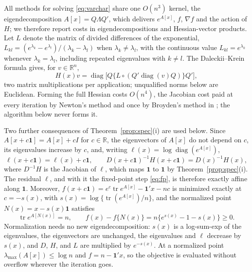 \documentclass[11pt]{article}
\newcommand{\R}{\mathbb{R}}
\newcommand{\tr}{\operatorname{tr}}
\newcommand{\diag}{\operatorname{diag}}
\newcommand{\one}{\mathbf{1}}
\begin{document}
All methods for solving \eqref{eq:varchar} share one $O(n^{3})$
kernel, the eigendecomposition
$A[x]=Q\Lambda Q'$, which delivers $e^{A[x]}$, $f$, $\nabla f$ and the
action of $H$; we therefore report costs in eigendecompositions and
Hessian-vector products. Let $L$ denote the matrix of divided
differences of the exponential,
$L_{kl}=(e^{\lambda_k}-e^{\lambda_l})/(\lambda_k-\lambda_l)$ when
$\lambda_k\neq\lambda_l$, with the continuous value
$L_{kl}=e^{\lambda_k}$ whenever $\lambda_k=\lambda_l$, including
repeated eigenvalues with $k\neq l$. The Daleckii--Krein formula gives,
for $v\in\R^{n}$,
\begin{equation}\label{eq:hv}
H(x)v=\diag\big[Q\{L\circ(Q'\diag(v)Q)\}Q'\big],
\end{equation}
two matrix multiplications per application; unqualified norms below are
Euclidean. Forming the full Hessian costs $O(n^{4})$, the Jacobian cost
paid at every iteration by Newton's method and once by Broyden's method
in \citet{ChenFeiYu:2025}; the algorithm below never forms it.

Two further consequences of Theorem~\ref{prop:spec}(i) are used
below. Since $A[x+c\one]=A[x]+cI$ for $c\in\R$, the eigenvectors of
$A[x]$ do not depend on $c$, its eigenvalues increase by $c$, and,
writing $\ell(x)=\log\diag(e^{A[x]})$,
\begin{equation}\label{eq:shift}
\ell(x+c\one)=\ell(x)+c\one,\qquad
D(x+c\one)^{-1}H(x+c\one)=D(x)^{-1}H(x),
\end{equation}
where $D^{-1}H$ is the Jacobian of $\ell$, which maps $\one$ to
$\one$ by Theorem~\ref{prop:spec}(i). The residual $\ell$, and with
it the fixed-point step \eqref{eq:fp}, is therefore exactly affine
along $\one$. Moreover, $f(x+c\one)=e^{c}\tr e^{A[x]}-\one'x-nc$ is
minimized exactly at $c=-s(x)$, with $s(x)=\log\{\tr(e^{A[x]})/n\}$,
and the normalized point $N(x)=x-s(x)\one$ satisfies
\begin{equation}\label{eq:norm}
\tr e^{A[N(x)]}=n,\qquad
f(x)-f\{N(x)\}=n\{e^{s(x)}-1-s(x)\}\geq0.
\end{equation}
Normalization needs no new eigendecomposition: $s(x)$ is a
log-sum-exp of the eigenvalues, the eigenvectors are unchanged, the
eigenvalues and $\ell$ decrease by $s(x)$, and $D$, $H$, and $L$ are
multiplied by $e^{-s(x)}$. At a normalized point
$\lambda_{\max}(A[x])\leq\log n$ and $f=n-\one'x$, so the objective
is evaluated without overflow wherever the iteration goes.
\end{document}
